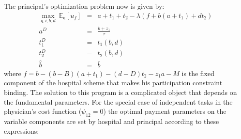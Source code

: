 \documentclass[12pt,letterpaper]{article}
\begin{document}
The principal's optimization problem now is given by:
\begin{eqnarray*}
  \max\limits_{q,i,b,d}\ \mathbb{E}_{\mathbold{\epsilon}}[u_f]&=&a+t_1+t_2-\lambda\left (f+b(a+t_1)+dt_2\right ) \\
  a^D&=&\frac{b+z_1}{\tau}\\
  t_1^D &=& t_1(b,d) \\
  t_2^D &=& t_2(b,d)\\
  \hat{b}&=&\bar{b}
\end{eqnarray*}
where $f=\bar{b}-(b-B)(a+t_1)-(d-D)t_2-z_1a-M$ is the fixed component of the hospital scheme that makes his participation constraint binding. The solution to this program is a complicated object that  depends on the fundamental parameters. For the special case of independent tasks in the physician's cost function ($\psi_{12}=0$) the optimal payment parameters on the variable components are set by hospital and principal according to these expressions:
\end{document}
